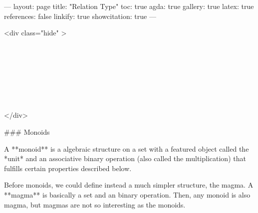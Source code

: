 ---
layout: page
title: "Relation Type"
toc: true
agda: true
gallery: true
latex: true
references: false
linkify: true
showcitation: true
---

<div class="hide" >
\begin{code}%
\>[0]\AgdaSymbol{\{-\#}\AgdaSpace{}%
\AgdaSpace{}%
\AgdaSpace{}%
\AgdaSymbol{\#-\}}\<%
\\
\>[0]\AgdaSpace{}%
\AgdaSpace{}%
\<%
\\
\>[0]\AgdaSpace{}%
\AgdaSpace{}%
\<%
\\
%
\\[\AgdaEmptyExtraSkip]%
\>[0]\AgdaSpace{}%
\AgdaSpace{}%
\<%
\\
\>[0]\AgdaSpace{}%
\AgdaSpace{}%
\<%
\\
\>[0]\AgdaSpace{}%
\AgdaSpace{}%
\<%
\end{code}
</div>

### Monoids

A **monoid** is a algebraic structure on a set with a featured object called the
*unit* and an associative binary operation (also called the multiplication) that
fulfills certain properties described below.

Before monoids, we could define instead a much simpler structure, the magma. A
**magma** is basically a set and an binary operation. Then, any monoid is also
magma, but magmas are not so interesting as the monoids.

\begin{code}%
\>[0]\<%
\\
\>[0][@{}l@{\AgdaIndent{0}}]%
\>[2]\<%
\\
\>[2][@{}l@{\AgdaIndent{0}}]%
\>[4]\<%
\end{code}

